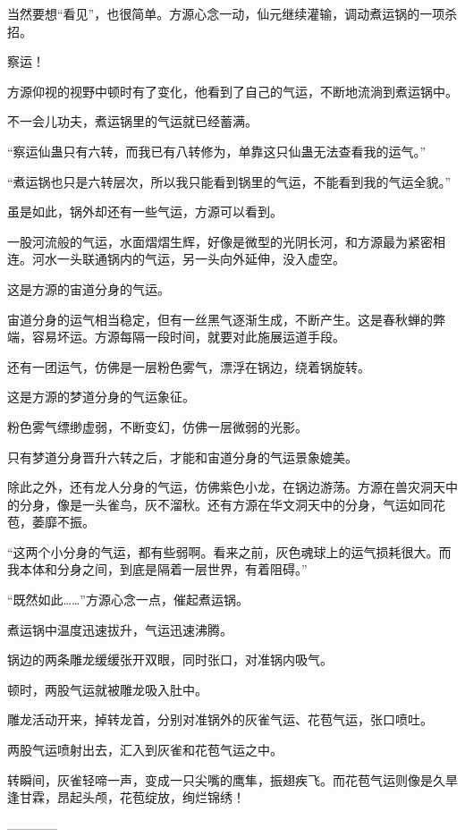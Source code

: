 \begin{this_body}
当然要想“看见”，也很简单。方源心念一动，仙元继续灌输，调动煮运锅的一项杀招。

察运！

方源仰视的视野中顿时有了变化，他看到了自己的气运，不断地流淌到煮运锅中。

不一会儿功夫，煮运锅里的气运就已经蓄满。

“察运仙蛊只有六转，而我已有八转修为，单靠这只仙蛊无法查看我的运气。”

“煮运锅也只是六转层次，所以我只能看到锅里的气运，不能看到我的气运全貌。”

虽是如此，锅外却还有一些气运，方源可以看到。

一股河流般的气运，水面熠熠生辉，好像是微型的光阴长河，和方源最为紧密相连。河水一头联通锅内的气运，另一头向外延伸，没入虚空。

这是方源的宙道分身的气运。

宙道分身的运气相当稳定，但有一丝黑气逐渐生成，不断产生。这是春秋蝉的弊端，容易坏运。方源每隔一段时间，就要对此施展运道手段。

还有一团运气，仿佛是一层粉色雾气，漂浮在锅边，绕着锅旋转。

这是方源的梦道分身的气运象征。

粉色雾气缥缈虚弱，不断变幻，仿佛一层微弱的光影。

只有梦道分身晋升六转之后，才能和宙道分身的气运景象媲美。

除此之外，还有龙人分身的气运，仿佛紫色小龙，在锅边游荡。方源在兽灾洞天中的分身，像是一头雀鸟，灰不溜秋。还有方源在华文洞天中的分身，气运如同花苞，萎靡不振。

“这两个小分身的气运，都有些弱啊。看来之前，灰色魂球上的运气损耗很大。而我本体和分身之间，到底是隔着一层世界，有着阻碍。”

“既然如此……”方源心念一点，催起煮运锅。

煮运锅中温度迅速拔升，气运迅速沸腾。

锅边的两条雕龙缓缓张开双眼，同时张口，对准锅内吸气。

顿时，两股气运就被雕龙吸入肚中。

雕龙活动开来，掉转龙首，分别对准锅外的灰雀气运、花苞气运，张口喷吐。

两股气运喷射出去，汇入到灰雀和花苞气运之中。

转瞬间，灰雀轻啼一声，变成一只尖嘴的鹰隼，振翅疾飞。而花苞气运则像是久旱逢甘霖，昂起头颅，花苞绽放，绚烂锦绣！

------------

\end{this_body}

